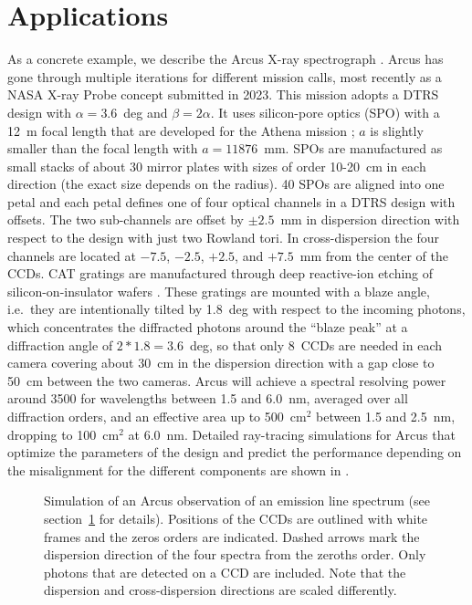 \documentclass[linenumbers]{aastex631}
\begin{document}
\section{Applications}
\label{sect:applications}
As a concrete example, we describe the Arcus X-ray spectrograph  \citep{2023SPIE12678E..0ES}. Arcus has gone through multiple iterations for different mission calls, most recently as a NASA X-ray Probe concept submitted in 2023. This mission adopts a DTRS design with $\alpha=3.6$~deg and $\beta=2\alpha$. It uses silicon-pore optics (SPO) with a 12~m focal length that are developed for the Athena mission \citep{2023SPIE12679E..05G}; $a$ is slightly smaller than the focal length with $a=11876$~mm. SPOs are manufactured as small stacks of about 30 mirror plates with sizes of order 10-20~cm in each direction (the exact size depends on the radius). 40 SPOs are aligned into one petal and each petal defines one of four optical channels in a DTRS design with offsets. The two sub-channels are offset by $\pm2.5$~mm in dispersion direction with respect to the design with just two Rowland tori. In cross-dispersion the four channels are located at $-7.5$, $-2.5$, $+2.5$, and $+7.5$~mm from the center of the CCDs.
CAT gratings are manufactured through deep reactive-ion etching of silicon-on-insulator wafers \citep{2022ApJ...934..171H,2023SPIE12679E..0LH}. These gratings are mounted with a blaze angle, i.e.\ they are intentionally tilted by 1.8~deg with respect to the incoming photons, which concentrates the diffracted photons around the ``blaze peak'' at a diffraction angle of $2 * 1.8 = 3.6$~deg, so that only 8~CCDs are needed in each camera covering about 30~cm in the dispersion direction with a gap close to 50~cm between the two cameras. Arcus will achieve a spectral resolving power around 3500 for wavelengths between 1.5 and 6.0~nm, averaged over all diffraction orders, and an effective area up to 500~cm$^2$ between 1.5 and 2.5~nm, dropping to 100~cm$^2$ at 6.0~nm. Detailed ray-tracing simulations for Arcus that optimize the parameters of the design and predict the performance depending on the misalignment for the different components are shown in \citet{2017SPIE10397E..0PG,2018SPIE10699E..6FG,2023SPIE12678E..1DG}.


\begin{figure}
    \caption{Simulation of an Arcus observation of an emission line spectrum (see section~\ref{sect:applications} for details). Positions of the CCDs are outlined with white frames and the zeros orders are indicated. Dashed arrows mark the dispersion direction of the four spectra from the zeroths order. Only photons that are detected on a CCD are included. Note that the dispersion and cross-dispersion directions are scaled differently.
        }
    \label{fig:Arcusfull}
\end{figure}
\end{document}
